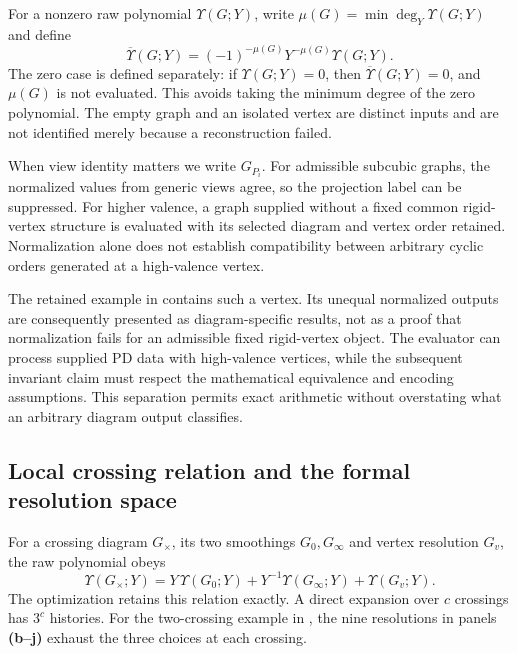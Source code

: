 For a nonzero raw polynomial $\Upsilon(G;Y)$, write $\mu(G)=\min\deg_Y\Upsilon(G;Y)$ and define
\begin{equation}
\overline{\Upsilon}(G;Y)=(-1)^{-\mu(G)}Y^{-\mu(G)}\Upsilon(G;Y).
\label{suppeq:yamada_normalization}
\end{equation}
The zero case is defined separately: if $\Upsilon(G;Y)=0$, then $\overline{\Upsilon}(G;Y)=0$, and $\mu(G)$ is not evaluated. This avoids taking the minimum degree of the zero polynomial. The empty graph and an isolated vertex are distinct inputs and are not identified merely because a reconstruction failed.

When view identity matters we write $G_{P_i}$. For admissible subcubic graphs, the normalized values from generic views agree, so the projection label can be suppressed. For higher valence, a graph supplied without a fixed common rigid-vertex structure is evaluated with its selected diagram and vertex order retained. Normalization alone does not establish compatibility between arbitrary cyclic orders generated at a high-valence vertex.

The retained example in  contains such a vertex. Its unequal normalized outputs are consequently presented as diagram-specific results, not as a proof that normalization fails for an admissible fixed rigid-vertex object. The evaluator can process supplied PD data with high-valence vertices, while the subsequent invariant claim must respect the mathematical equivalence and encoding assumptions. This separation permits exact arithmetic without overstating what an arbitrary diagram output classifies.

\subsection{Local crossing relation and the formal resolution space}
\label{supp:local_yamada_relation}
For a crossing diagram $G_\times$, its two smoothings $G_0,G_\infty$ and vertex resolution $G_v$, the raw polynomial obeys
\begin{equation}
\Upsilon(G_\times;Y)=Y\,\Upsilon(G_0;Y)+Y^{-1}\Upsilon(G_\infty;Y)+\Upsilon(G_v;Y).
\label{suppeq:yamada_local_relation}
\end{equation}
The optimization retains this relation exactly. A direct expansion over $c$ crossings has $3^c$ histories. For the two-crossing example in , the nine resolutions in panels \textbf{(b--j)} exhaust the three choices at each crossing.

